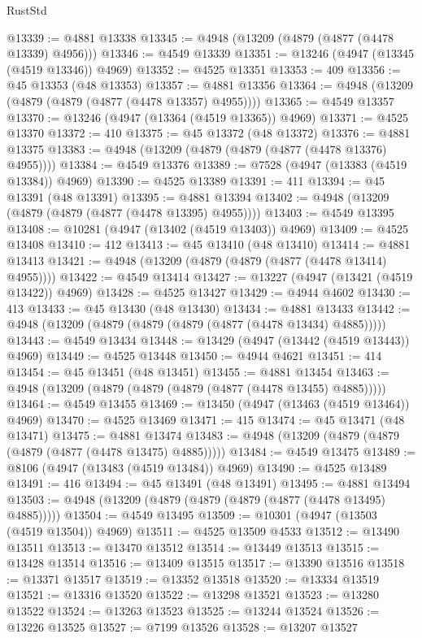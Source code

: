 \begin{lexlean}{RustStd}
\begin{coremodule}
{\begin{coremodule}
{{{{{{{{{{{{{{{{{{{{{{{{{{{{{{{{{{{{{{{{{{{{{{{{{{{{{{{{{{{{@13339 := @4881 @13338
@13345 := @4948 (@13209 (@4879 (@4877 (@4478 @13339) @4956)))
@13346 := @4549 @13339
@13351 := @13246 (@4947 (@13345 (@4519 @13346)) @4969)
@13352 := @4525 @13351
@13353 := 409
@13356 := @45 @13353 (@48 @13353)
@13357 := @4881 @13356
@13364 := @4948 (@13209 (@4879 (@4879 (@4877 (@4478 @13357) @4955))))
@13365 := @4549 @13357
@13370 := @13246 (@4947 (@13364 (@4519 @13365)) @4969)
@13371 := @4525 @13370
@13372 := 410
@13375 := @45 @13372 (@48 @13372)
@13376 := @4881 @13375
@13383 := @4948 (@13209 (@4879 (@4879 (@4877 (@4478 @13376) @4955))))
@13384 := @4549 @13376
@13389 := @7528 (@4947 (@13383 (@4519 @13384)) @4969)
@13390 := @4525 @13389
@13391 := 411
@13394 := @45 @13391 (@48 @13391)
@13395 := @4881 @13394
@13402 := @4948 (@13209 (@4879 (@4879 (@4877 (@4478 @13395) @4955))))
@13403 := @4549 @13395
@13408 := @10281 (@4947 (@13402 (@4519 @13403)) @4969)
@13409 := @4525 @13408
@13410 := 412
@13413 := @45 @13410 (@48 @13410)
@13414 := @4881 @13413
@13421 := @4948 (@13209 (@4879 (@4879 (@4877 (@4478 @13414) @4955))))
@13422 := @4549 @13414
@13427 := @13227 (@4947 (@13421 (@4519 @13422)) @4969)
@13428 := @4525 @13427
@13429 := @4944 @4602
@13430 := 413
@13433 := @45 @13430 (@48 @13430)
@13434 := @4881 @13433
@13442 := @4948 (@13209 (@4879 (@4879 (@4879 (@4877 (@4478 @13434) @4885)))))
@13443 := @4549 @13434
@13448 := @13429 (@4947 (@13442 (@4519 @13443)) @4969)
@13449 := @4525 @13448
@13450 := @4944 @4621
@13451 := 414
@13454 := @45 @13451 (@48 @13451)
@13455 := @4881 @13454
@13463 := @4948 (@13209 (@4879 (@4879 (@4879 (@4877 (@4478 @13455) @4885)))))
@13464 := @4549 @13455
@13469 := @13450 (@4947 (@13463 (@4519 @13464)) @4969)
@13470 := @4525 @13469
@13471 := 415
@13474 := @45 @13471 (@48 @13471)
@13475 := @4881 @13474
@13483 := @4948 (@13209 (@4879 (@4879 (@4879 (@4877 (@4478 @13475) @4885)))))
@13484 := @4549 @13475
@13489 := @8106 (@4947 (@13483 (@4519 @13484)) @4969)
@13490 := @4525 @13489
@13491 := 416
@13494 := @45 @13491 (@48 @13491)
@13495 := @4881 @13494
@13503 := @4948 (@13209 (@4879 (@4879 (@4879 (@4877 (@4478 @13495) @4885)))))
@13504 := @4549 @13495
@13509 := @10301 (@4947 (@13503 (@4519 @13504)) @4969)
@13511 := @4525 @13509 @4533
@13512 := @13490 @13511
@13513 := @13470 @13512
@13514 := @13449 @13513
@13515 := @13428 @13514
@13516 := @13409 @13515
@13517 := @13390 @13516
@13518 := @13371 @13517
@13519 := @13352 @13518
@13520 := @13334 @13519
@13521 := @13316 @13520
@13522 := @13298 @13521
@13523 := @13280 @13522
@13524 := @13263 @13523
@13525 := @13244 @13524
@13526 := @13226 @13525
@13527 := @7199 @13526
@13528 := @13207 @13527
}}}}}}}}}}}}}}}}}}}}}}}}}}}}}}}}}}}}}}}}}}}}}}}}}}}}}}}}}}}}
\end{coremodule}}
\end{coremodule}
\end{lexlean}
